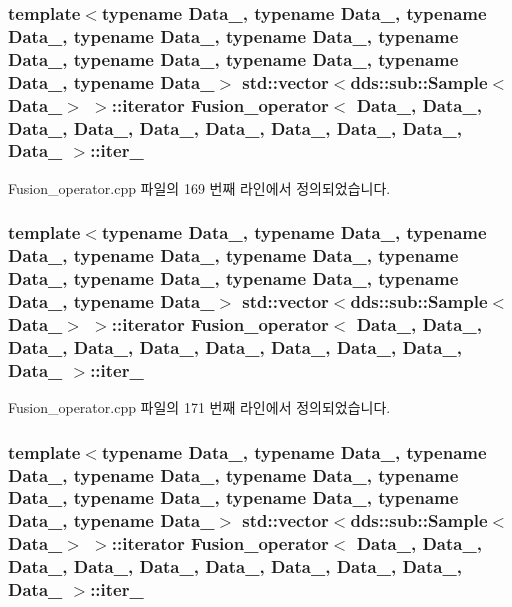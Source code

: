 \subsubsection[{\texorpdfstring{iter\+\_\+4}{iter_4}}]{\setlength{\rightskip}{0pt plus 5cm}template$<$typename Data\+\_, typename Data\+\_, typename Data\+\_, typename Data\+\_, typename Data\+\_, typename Data\+\_, typename Data\+\_, typename Data\+\_, typename Data\+\_, typename Data\+\_$>$ std\+::vector$<$dds\+::sub\+::\+Sample$<$Data\+\_$>$ $>$\+::iterator {\bf Fusion\+\_\+operator}$<$ Data\+\_, Data\+\_, Data\+\_, Data\+\_, Data\+\_, Data\+\_, Data\+\_, Data\+\_, Data\+\_, Data\+\_ $>$\+::iter\+\_}\hypertarget{classFusion__operator_a98de1068d698554103ec8b77a012df5b}{}\label{classFusion__operator_a98de1068d698554103ec8b77a012df5b}


Fusion\+\_\+operator.\+cpp 파일의 169 번째 라인에서 정의되었습니다.

\subsubsection[{\texorpdfstring{iter\+\_\+5}{iter_5}}]{\setlength{\rightskip}{0pt plus 5cm}template$<$typename Data\+\_, typename Data\+\_, typename Data\+\_, typename Data\+\_, typename Data\+\_, typename Data\+\_, typename Data\+\_, typename Data\+\_, typename Data\+\_, typename Data\+\_$>$ std\+::vector$<$dds\+::sub\+::\+Sample$<$Data\+\_$>$ $>$\+::iterator {\bf Fusion\+\_\+operator}$<$ Data\+\_, Data\+\_, Data\+\_, Data\+\_, Data\+\_, Data\+\_, Data\+\_, Data\+\_, Data\+\_, Data\+\_ $>$\+::iter\+\_}\hypertarget{classFusion__operator_a323bf6a71abd728d9ef6daa5ed1b1ab2}{}\label{classFusion__operator_a323bf6a71abd728d9ef6daa5ed1b1ab2}


Fusion\+\_\+operator.\+cpp 파일의 171 번째 라인에서 정의되었습니다.

\subsubsection[{\texorpdfstring{iter\+\_\+6}{iter_6}}]{\setlength{\rightskip}{0pt plus 5cm}template$<$typename Data\+\_, typename Data\+\_, typename Data\+\_, typename Data\+\_, typename Data\+\_, typename Data\+\_, typename Data\+\_, typename Data\+\_, typename Data\+\_, typename Data\+\_$>$ std\+::vector$<$dds\+::sub\+::\+Sample$<$Data\+\_$>$ $>$\+::iterator {\bf Fusion\+\_\+operator}$<$ Data\+\_, Data\+\_, Data\+\_, Data\+\_, Data\+\_, Data\+\_, Data\+\_, Data\+\_, Data\+\_, Data\+\_ $>$\+::iter\+\_}\hypertarget{classFusion__operator_a38913c414f92a70db936c629ddfb4fb0}{}\label{classFusion__operator_a38913c414f92a70db936c629ddfb4fb0}


